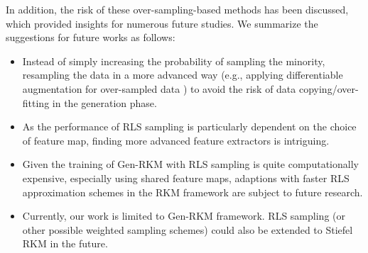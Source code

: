 In addition, the risk of these over-sampling-based methods has been discussed, which provided insights for numerous future studies. We summarize the suggestions for future works as follows:
\begin{itemize}[label={--}]
    \item Instead of simply increasing the probability of sampling the minority, resampling the data in a more advanced way (e.g., applying differentiable augmentation for over-sampled data \cite{zhaoDifferentiableAugmentationDataEfficient2020}) to avoid the risk of data copying/over-fitting in the generation phase.
    \item As the performance of RLS sampling is particularly dependent on the choice of feature map, finding more advanced feature extractors is intriguing.
    \item Given the training of Gen-RKM with RLS sampling is quite computationally expensive, especially using shared feature maps, adaptions with faster RLS approximation schemes in the RKM framework are subject to future research.
    \item Currently, our work is limited to Gen-RKM framework. RLS sampling (or other possible weighted sampling schemes) could also be extended to Stiefel RKM\cite{pandeyDisentangledRepresentationLearning2022} in the future.
\end{itemize}



